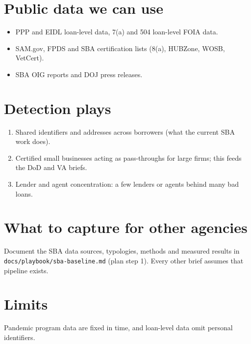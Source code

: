 \documentclass[letterpaper,11pt]{article}
\providecommand{\tightlist}{\setlength{\itemsep}{0pt}\setlength{\parskip}{0pt}}
\begin{document}
\hypertarget{public-data-we-can-use}{%
\section{Public data we can use}\label{public-data-we-can-use}}

\begin{itemize}
\tightlist
\item
  PPP and EIDL loan-level data, 7(a) and 504 loan-level FOIA data.
\item
  SAM.gov, FPDS and SBA certification lists (8(a), HUBZone, WOSB,
  VetCert).
\item
  SBA OIG reports and DOJ press releases.
\end{itemize}

\hypertarget{detection-plays}{%
\section{Detection plays}\label{detection-plays}}

\begin{enumerate}
\def\labelenumi{\arabic{enumi}.}
\tightlist
\item
  Shared identifiers and addresses across borrowers (what the current
  SBA work does).
\item
  Certified small businesses acting as pass-throughs for large firms;
  this feeds the DoD and VA briefs.
\item
  Lender and agent concentration: a few lenders or agents behind many
  bad loans.
\end{enumerate}

\hypertarget{what-to-capture-for-other-agencies}{%
\section{What to capture for other
agencies}\label{what-to-capture-for-other-agencies}}

Document the SBA data sources, typologies, methods and measured results
in \texttt{docs/playbook/sba-baseline.md} (plan step 1). Every other
brief assumes that pipeline exists.

\hypertarget{limits}{%
\section{Limits}\label{limits}}

Pandemic program data are fixed in time, and loan-level data omit
personal identifiers.
\end{document}
